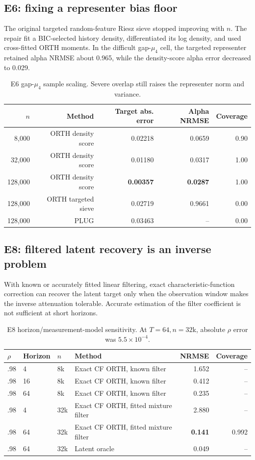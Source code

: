 \documentclass[10pt]{article}
\newcommand{\best}[1]{\ifmmode\boldsymbol{#1}\else\textbf{#1}\fi}
\begin{document}
\subsection{E6: fixing a representer bias floor}

The original targeted random-feature Riesz sieve stopped improving with $n$. The repair fit a BIC-selected history density, differentiated its log density, and used cross-fitted ORTH moments. In the difficult gap-$\mu_4$ cell, the targeted representer retained alpha NRMSE about 0.965, while the density-score alpha error decreased to 0.029.

\begin{table}[H]
\centering\small
\begin{tabular}{rrrrr}
\toprule
$n$ & Method & Target abs. error & Alpha NRMSE & Coverage \\
\midrule
8,000 & ORTH density score & 0.02218 & 0.0659 & 0.90 \\
32,000 & ORTH density score & 0.01180 & 0.0317 & 1.00 \\
128,000 & ORTH density score & \best{0.00357} & \best{0.0287} & 1.00 \\
128,000 & ORTH targeted sieve & 0.02719 & 0.9661 & 0.00 \\
128,000 & PLUG & 0.03463 & -- & 0.00 \\
\bottomrule
\end{tabular}
\caption{E6 gap-$\mu_4$ sample scaling. Severe overlap still raises the representer norm and variance.}
\end{table}

\subsection{E8: filtered latent recovery is an inverse problem}

With known or accurately fitted linear filtering, exact characteristic-function correction can recover the latent target only when the observation window makes the inverse attenuation tolerable. Accurate estimation of the filter coefficient is not sufficient at short horizons.

\begin{table}[H]
\centering\small
\begin{tabularx}{0.92\linewidth}{L{1.1cm}L{1.2cm}L{1.4cm}Y rr}
\toprule
$\rho$ & Horizon & $n$ & Method & NRMSE & Coverage \\
\midrule
.98 & 4 & 8k & Exact CF ORTH, known filter & 1.652 & -- \\
.98 & 16 & 8k & Exact CF ORTH, known filter & 0.412 & -- \\
.98 & 64 & 8k & Exact CF ORTH, known filter & 0.235 & -- \\
.98 & 4 & 32k & Exact CF ORTH, fitted mixture filter & 2.880 & -- \\
.98 & 64 & 32k & Exact CF ORTH, fitted mixture filter & \best{0.141} & 0.992 \\
.98 & 64 & 32k & Latent oracle & 0.049 & -- \\
\bottomrule
\end{tabularx}
\caption{E8 horizon/measurement-model sensitivity. At $T=64,n=32$k, absolute $\rho$ error was $5.5\times10^{-4}$.}
\end{table}
\end{document}
